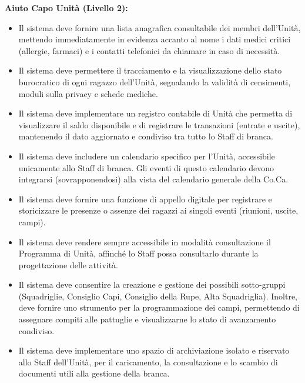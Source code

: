 \documentclass[11pt]{article}
\numberwithin{figure}{section}
\begin{document}
\textbf{Aiuto Capo Unità (Livello 2):}
\begin{itemize}[topsep=0 pt]
    \item Il sistema deve fornire una lista anagrafica consultabile dei membri dell'Unità, mettendo immediatamente in evidenza accanto al nome i dati medici critici (allergie, farmaci) e i contatti telefonici da chiamare in caso di necessità.
    \item Il sistema deve permettere il tracciamento e la visualizzazione dello stato burocratico di ogni ragazzo dell'Unità, segnalando la validità di censimenti, moduli sulla privacy e schede mediche.
    \item Il sistema deve implementare un registro contabile di Unità che permetta di visualizzare il saldo disponibile e di registrare le transazioni (entrate e uscite), mantenendo il dato aggiornato e condiviso tra tutto lo Staff di branca.
    \item Il sistema deve includere un calendario specifico per l'Unità, accessibile unicamente allo Staff di branca. Gli eventi di questo calendario devono integrarsi (sovrapponendosi) alla vista del calendario generale della Co.Ca.
    \item Il sistema deve fornire una funzione di appello digitale per registrare e storicizzare le presenze o assenze dei ragazzi ai singoli eventi (riunioni, uscite, campi).
    \item Il sistema deve rendere sempre accessibile in modalità consultazione il Programma di Unità, affinché lo Staff possa consultarlo durante la progettazione delle attività.
    \item Il sistema deve consentire la creazione e gestione dei possibili sotto-gruppi (Squadriglie, Consiglio Capi, Consiglio della Rupe, Alta Squadriglia). Inoltre, deve fornire uno strumento per la programmazione dei campi, permettendo di assegnare compiti alle pattuglie e visualizzarne lo stato di avanzamento condiviso.
    \item Il sistema deve implementare uno spazio di archiviazione isolato e riservato allo Staff dell'Unità, per il caricamento, la consultazione e lo scambio di documenti utili alla gestione della branca.
\end{itemize}

\vspace{1cm}
\end{document}
